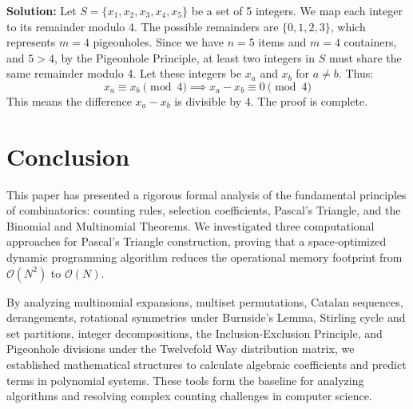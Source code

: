 \documentclass[10pt,journal,compsoc,onecolumn]{IEEEtran}
\begin{document}
\textbf{Solution:}
Let $S = \{x_1, x_2, x_3, x_4, x_5\}$ be a set of 5 integers.
We map each integer to its remainder modulo 4.
The possible remainders are $\{0, 1, 2, 3\}$, which represents $m = 4$ pigeonholes.
Since we have $n = 5$ items and $m = 4$ containers, and $5 > 4$, by the Pigeonhole Principle, at least two integers in $S$ must share the same remainder modulo 4.
Let these integers be $x_a$ and $x_b$ for $a \neq b$. Thus:
\begin{equation}
x_a \equiv x_b \pmod 4 \implies x_a - x_b \equiv 0 \pmod 4
\end{equation}
This means the difference $x_a - x_b$ is divisible by 4. The proof is complete.

\section{Conclusion}
\label{sec:conclusion}

This paper has presented a rigorous formal analysis of the fundamental principles of combinatorics: counting rules, selection coefficients, Pascal's Triangle, and the Binomial and Multinomial Theorems. We investigated three computational approaches for Pascal's Triangle construction, proving that a space-optimized dynamic programming algorithm reduces the operational memory footprint from $\mathcal{O}(N^2)$ to $\mathcal{O}(N)$. 

By analyzing multinomial expansions, multiset permutations, Catalan sequences, derangements, rotational symmetries under Burnside's Lemma, Stirling cycle and set partitions, integer decompositions, the Inclusion-Exclusion Principle, and Pigeonhole divisions under the Twelvefold Way distribution matrix, we established mathematical structures to calculate algebraic coefficients and predict terms in polynomial systems. These tools form the baseline for analyzing algorithms and resolving complex counting challenges in computer science.
\end{document}

